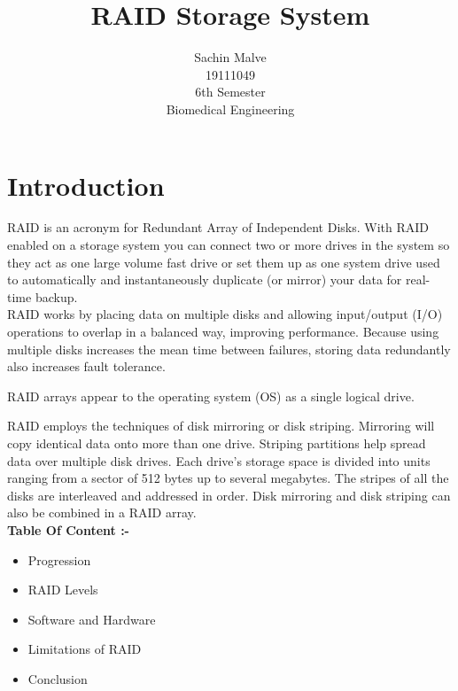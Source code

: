 \documentclass{article}
\begin{document}
\title{RAID Storage System}


\author{Sachin Malve \\
	19111049 \\
 	6th Semester \\ 
	Biomedical Engineering\\
	}

\maketitle 
 \hrulefill

\section{Introduction}
 RAID is an acronym for Redundant Array of Independent Disks. With RAID enabled on a storage system you can connect two or more drives in the system so they act as one large volume fast drive or set them up as one system drive used to automatically and instantaneously duplicate (or mirror) your data for real-time backup. \\
 RAID works by placing data on multiple disks and allowing input/output (I/O) operations to overlap in a balanced way, improving performance. Because using multiple disks increases the mean time between failures, storing data redundantly also increases fault tolerance.

RAID arrays appear to the operating system (OS) as a single logical drive.

RAID employs the techniques of disk mirroring or disk striping. Mirroring will copy identical data onto more than one drive. Striping partitions help spread data over multiple disk drives. Each drive's storage space is divided into units ranging from a sector of 512 bytes up to several megabytes. The stripes of all the disks are interleaved and addressed in order. Disk mirroring and disk striping can also be combined in a RAID array.\\

\textbf{Table Of Content :- }


\begin{itemize}
\item Progression
\item RAID Levels
\item Software and Hardware
\item Limitations of RAID
\item Conclusion

\end{itemize}
\end{document}
